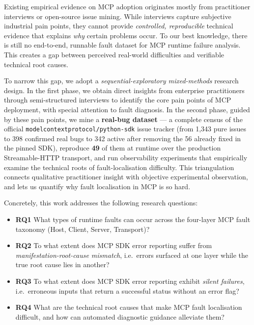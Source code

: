 Existing empirical evidence on MCP adoption originates mostly from practitioner
interviews \cite{ma2025practitioners} or open-source issue mining. While interviews capture
subjective industrial pain points, they cannot provide \emph{controlled, reproducible}
technical evidence that explains \emph{why} certain problems occur. To our best knowledge,
there is still no end-to-end, runnable fault dataset for MCP runtime failure analysis. This
creates a gap between perceived real-world difficulties and verifiable technical root
causes.

To narrow this gap, we adopt a \emph{sequential-exploratory mixed-methods} research design.
In the first phase, we obtain direct insights from enterprise practitioners through
semi-structured interviews to identify the core pain points of MCP deployment, with special
attention to fault diagnosis. In the second phase, guided by these pain points, we mine a
\textbf{real-bug dataset} --- a complete census of the official
\verb|modelcontextprotocol/python-sdk| issue tracker (from 1,343 pure issues to 398
confirmed real bugs to 342 active after removing the 56 already
fixed in the pinned SDK), reproduce \textbf{49} of them at runtime over the production
Streamable-HTTP transport, and run observability experiments that empirically examine the
technical roots of fault-localisation difficulty. This triangulation connects qualitative
practitioner insight with objective experimental observation, and lets us quantify why fault
localisation in MCP is so hard.

Concretely, this work addresses the following research questions:
\begin{itemize}
  \item \textbf{RQ1} What types of runtime faults can occur across the four-layer MCP
        fault taxonomy (Host, Client, Server, Transport)?
  \item \textbf{RQ2} To what extent does MCP SDK error reporting suffer from
        \emph{manifestation-root-cause mismatch}, i.e.\ errors surfaced at one layer while
        the true root cause lies in another?
  \item \textbf{RQ3} To what extent does MCP SDK error reporting exhibit \emph{silent
        failures}, i.e.\ erroneous inputs that return a successful status without an error
        flag?
  \item \textbf{RQ4} What are the technical root causes that make MCP fault localisation
        difficult, and how can automated diagnostic guidance alleviate them?
\end{itemize}


